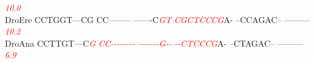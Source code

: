 \documentclass[11pt,twoside,reqno,a4paper]{article}
\begin{document}
{\hspace*{7\charwidth}\hspace*{1\charwidth}\hspace*{1\charwidth}\hspace*{29\charwidth}\textit{\textcolor{Red}{10.0}}\hspace*{1\charwidth}\hspace*{1\charwidth}\hspace*{1\charwidth}\\
DroEre	CCTGGT---CG	CC--------	-------C\textit{\textcolor{Red}{G}}\textit{\textcolor{Red}{T}}	\textit{\textcolor{Red}{C}}\textit{\textcolor{Red}{G}}\textit{\textcolor{Red}{C}}\textit{\textcolor{Red}{T}}\textit{\textcolor{Red}{C}}\textit{\textcolor{Red}{C}}\textit{\textcolor{Red}{C}}\textit{\textcolor{Red}{G}}A-	--CCAGAC--	---------\\
\hspace*{7\charwidth}\hspace*{1\charwidth}\hspace*{1\charwidth}\hspace*{29\charwidth}\textit{\textcolor{Red}{10.2}}\hspace*{1\charwidth}\hspace*{1\charwidth}\hspace*{1\charwidth}\\
DroAna	CCTTGT---C\textit{\textcolor{Red}{G}}	\textit{\textcolor{Red}{C}}\textit{\textcolor{Red}{C}}\textit{\textcolor{Red}{-}}\textit{\textcolor{Red}{-}}\textit{\textcolor{Red}{-}}\textit{\textcolor{Red}{-}}\textit{\textcolor{Red}{-}}\textit{\textcolor{Red}{-}}\textit{\textcolor{Red}{-}}\textit{\textcolor{Red}{-}}	\textit{\textcolor{Red}{-}}\textit{\textcolor{Red}{-}}\textit{\textcolor{Red}{-}}\textit{\textcolor{Red}{-}}\textit{\textcolor{Red}{-}}\textit{\textcolor{Red}{-}}\textit{\textcolor{Red}{-}}\textit{\textcolor{Red}{G}}\textit{\textcolor{Red}{-}}\textit{\textcolor{Red}{-}}	\textit{\textcolor{Red}{-}}\textit{\textcolor{Red}{-}}\textit{\textcolor{Red}{C}}\textit{\textcolor{Red}{T}}\textit{\textcolor{Red}{C}}\textit{\textcolor{Red}{C}}\textit{\textcolor{Red}{C}}\textit{\textcolor{Red}{G}}A-	--CTAGAC--	---------\\
\hspace*{7\charwidth}\hspace*{10\charwidth}\textit{\textcolor{Red}{6.9}}\hspace*{1\charwidth}\hspace*{1\charwidth}\hspace*{1\charwidth}\hspace*{1\charwidth}\hspace*{1\charwidth}\\
}
\end{document}
